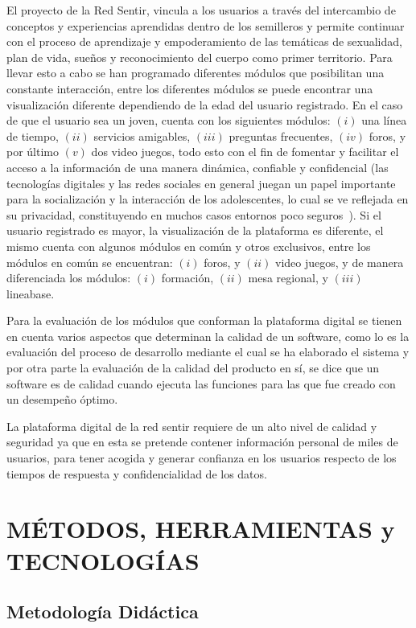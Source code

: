 \documentclass[journal,transmag]{IEEEtran}
\begin{document}
El proyecto de la Red Sentir, vincula a los usuarios a través del intercambio de conceptos y experiencias aprendidas dentro de los semilleros y permite continuar con el proceso de aprendizaje y empoderamiento de las temáticas de sexualidad, plan de vida, sueños y reconocimiento del cuerpo como primer territorio. Para llevar esto a cabo se han programado diferentes módulos que posibilitan una constante interacción, entre los diferentes módulos se puede encontrar una visualización diferente dependiendo de la edad del usuario registrado. 
En el caso de que el usuario sea un joven, cuenta con los siguientes módulos: $(i)$ una línea de tiempo, $(ii)$ servicios amigables, $(iii)$ preguntas frecuentes, $(iv)$ foros, y por último $(v)$ dos video juegos, todo esto con el fin de fomentar y facilitar el acceso a la información de una manera dinámica, confiable y confidencial (las tecnologías digitales y las redes sociales en general juegan un papel importante para la socialización y la interacción de los adolescentes, lo cual se ve reflejada en su privacidad, constituyendo en muchos casos entornos poco seguros~\cite{hasinoff2013sexting, boyd2007youth}). Si el usuario registrado es mayor, la visualización de la plataforma es diferente, el mismo cuenta con algunos módulos en común y otros exclusivos, entre los módulos en común se encuentran: $(i)$ foros, y $(ii)$ video juegos, y de manera diferenciada los módulos:  $(i)$ formación, $(ii)$ mesa regional, y $(iii)$ lineabase.

Para la evaluación de los módulos que conforman la plataforma digital se tienen en cuenta varios aspectos que determinan la calidad de un software, como lo es la evaluación del proceso de desarrollo mediante el cual se ha elaborado el sistema y por otra parte la evaluación de la calidad del producto en sí, se dice que un software es de calidad cuando ejecuta las funciones para las que fue creado con un desempeño óptimo.

La plataforma digital de la red sentir requiere de un alto nivel de calidad y seguridad ya que en esta se pretende contener información personal de miles de usuarios, para tener acogida y generar confianza en los usuarios respecto de los tiempos de respuesta y confidencialidad de los datos.

\section{MÉTODOS, HERRAMIENTAS y TECNOLOGÍAS}\label{sec:herramientas}

\subsection{Metodología Didáctica}
\end{document}
